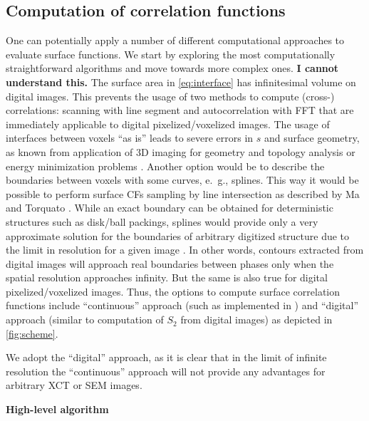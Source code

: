 \documentclass[reprint,amsmath,amssymb,aps,pre]{revtex4-1}
\begin{document}
\subsection{Computation of correlation functions}
One can potentially apply a number of different computational approaches to
evaluate surface functions. We start by exploring the most computationally
straightforward algorithms and move towards more complex ones. \textbf{I cannot
 understand this.} The surface area
in \cref{eq:interface} has infinitesimal volume on digital images. This prevents
the usage of two methods to compute (cross-) correlations: scanning with line
segment and autocorrelation with FFT that are immediately applicable to digital
pixelized/voxelized images. The usage of interfaces between voxels ``as is''
leads to severe errors in $s$ and surface geometry, as known from application of
3D imaging for geometry and topology analysis \cite{AWR_PNM} or energy
minimization problems \cite{jagged_surfaces}. Another option would be to
describe the boundaries between voxels with some curves, e.~g., splines. This
way it would be possible to perform surface CFs sampling by line intersection as
described by Ma and Torquato \cite{Ma_Torq}. While an exact boundary can be
obtained for deterministic structures such as disk/ball packings, splines
would provide only a very approximate solution for the boundaries of arbitrary
digitized structure due to the limit in resolution for a given image
\cite{Eusosoil2012}. In other words, contours extracted from digital images will
approach real boundaries between phases only when the spatial resolution
approaches infinity. But the same is also true for digital pixelized/voxelized
images. Thus, the options to compute surface correlation functions include
``continuous'' approach (such as implemented in \cite{Ma_Torq}) and ``digital''
approach (similar to computation of $S_2$ from digital images) as depicted in
\cref{fig:scheme}.

We adopt the ``digital'' approach, as it is clear that in the limit of infinite
resolution the ``continuous'' approach will not provide any advantages for
arbitrary XCT or SEM images.


\textbf{High-level algorithm}
\end{document}

